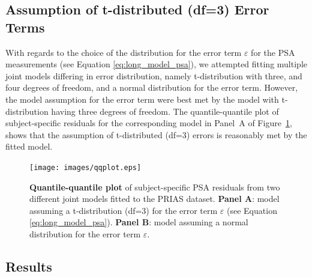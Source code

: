 \subsection{Assumption of t-distributed (df=3) Error Terms}
\label{subsec:t-dist-assumption}
With regards to the choice of the distribution for the error term $\varepsilon$ for the PSA measurements (see Equation \ref{eq:long_model_psa}), we attempted fitting multiple joint models differing in error distribution, namely t-distribution with three, and four degrees of freedom, and a normal distribution for the error term. However, the model assumption for the error term were best met by the model with t-distribution having three degrees of freedom. The quantile-quantile plot of subject-specific residuals for the corresponding model in Panel~A of Figure~\ref{fig:qqplot}, shows that the assumption of t-distributed (df=3) errors is reasonably met by the fitted model. 

\begin{figure}
\centerline{\texttt{[image: images/qqplot.eps]}}
\caption{\textbf{Quantile-quantile plot} of subject-specific PSA residuals from two different joint models fitted to the PRIAS dataset. \textbf{Panel A}: model assuming a t-distribution (df=3) for the error term $\varepsilon$ (see Equation \ref{eq:long_model_psa}). \textbf{Panel B}: model assuming a normal distribution for the error term $\varepsilon$.}
\label{fig:qqplot}
\end{figure}

\clearpage
\subsection{Results}

